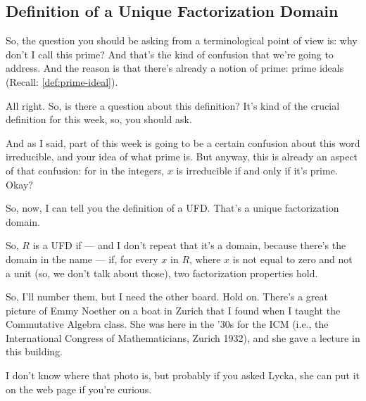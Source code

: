 \subsection{Definition of a Unique Factorization Domain}

\begin{speech}[00:09:28 - 00:11:04]
So, the question you should be asking from a terminological point of view is: why don't I call this prime? And that's the kind of confusion that we're going to address. And the reason is that there's already a notion of prime: prime ideals (Recall: \cref{def:prime-ideal}).

All right. So, is there a question about this definition? It's kind of the crucial definition for this week, so, you should ask.

And as I said, part of this week is going to be a certain confusion about this word irreducible, and your idea of what prime is. But anyway, this is already an aspect of that confusion: for in the integers, $x$ is irreducible if and only if it's prime. Okay?

So, now, I can tell you the definition  of a UFD. That's a unique factorization domain.

So, $R$ is a UFD  if --- and I don't repeat that it's a domain, because there's the domain in the name --- if, for every  $x$ in $R$, where $x$ is not equal to zero and not a unit (so, we don't talk about those), two factorization properties hold. 
\end{speech}

\begin{hidden}
\end{hidden}

\begin{speech}[00:11:04 - 00:11:55]
So, I'll number them, but I need the other board.  Hold on.
 There's a great picture of Emmy Noether on a boat in Zurich that I found when I taught the Commutative Algebra class. She was here in the '30s for the ICM (i.e., the International Congress of Mathematicians, Zurich 1932), and she gave a lecture in this building.

I don't know where that photo is, but probably if you asked Lycka, she can put it on the web page if you're curious. 
\end{speech}

